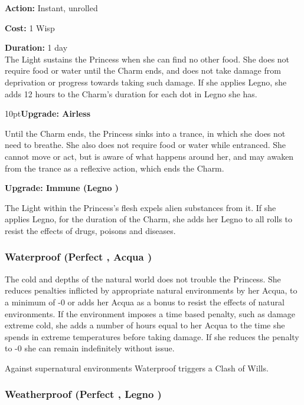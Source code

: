 \noindent \textbf{Action:} Instant, unrolled

\noindent \textbf{Cost:} 1 Wisp

\noindent \textbf{Duration:} 1 day \\

\noindent The Light sustains the Princess when she can find no other food. She does not require food or water until the Charm ends, and does not take damage from deprivation or progress towards taking such damage. If she applies Legno, she adds 12 hours to the Charm's duration for each dot in Legno she has.

\begin{myindentpar}{10pt}\textbf{Upgrade: Airless}

Until the Charm ends, the Princess sinks into a trance, in which she does not need to breathe. She also does not require food or water while entranced. She cannot move or act, but is aware of what happens around her, and may awaken from the trance as a reflexive action, which ends the Charm.

\textbf{Upgrade: Immune (Legno \textbullet\textbullet)}

The Light within the Princess's flesh expels alien substances from it. If she applies Legno, for the duration of the Charm, she adds her Legno to all rolls to resist the effects of drugs, poisons and diseases.\end{myindentpar}

\subsubsection*{Waterproof (Perfect \textbullet, Acqua \textbullet)}

The cold and depths of the natural world does not trouble the Princess. She reduces penalties inflicted by appropriate natural environments by her Acqua, to a minimum of -0 or adds her Acqua as a bonus to resist the effects of natural environments. If the environment imposes a time based penalty, such as damage extreme cold, she adds a number of hours equal to her Acqua to the time she spends in extreme temperatures before taking damage.  If she reduces the penalty to -0 she can remain indefinitely without issue. 

Against supernatural environments Waterproof triggers a Clash of Wills.

\subsubsection*{Weatherproof (Perfect \textbullet, Legno \textbullet)}

